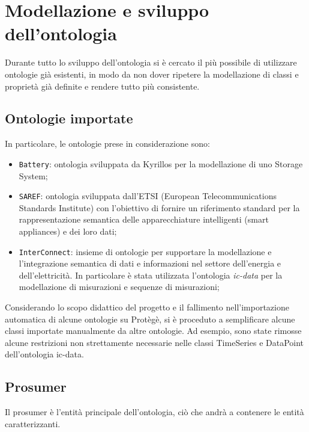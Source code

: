 \chapter{Modellazione e sviluppo dell'ontologia}
Durante tutto lo sviluppo dell'ontologia si è cercato il più possibile di utilizzare ontologie già esistenti, in modo da non dover ripetere la modellazione di classi e proprietà già definite e rendere tutto più consistente.

\section{Ontologie importate}

In particolare, le ontologie prese in considerazione sono:
\begin{itemize}
    \item \texttt{Battery}\cite{battery_kyrillos}: ontologia sviluppata da Kyrillos per la modellazione di uno Storage System;
    \item \texttt{SAREF}\cite{saref}: ontologia sviluppata dall'ETSI (European Telecommunications Standards Institute) con l'obiettivo di fornire un riferimento standard per la rappresentazione semantica delle apparecchiature intelligenti (smart appliances) e dei loro dati;
    \item \texttt{InterConnect}\cite{interconnect}: insieme di ontologie per supportare la modellazione e l'integrazione semantica di dati e informazioni nel settore dell'energia e dell'elettricità. In particolare è stata utilizzata l'ontologia \textit{ic-data}\cite{ic-data} per la modellazione di misurazioni e sequenze di misurazioni;
\end{itemize}

Considerando lo scopo didattico del progetto e il fallimento nell'importazione automatica di alcune ontologie su Protègè, si è proceduto a semplificare alcune classi importate manualmente da altre ontologie. Ad esempio, sono state rimosse alcune restrizioni non strettamente necessarie nelle classi TimeSeries e DataPoint dell'ontologia ic-data.

\section{Prosumer}
Il prosumer è l'entità principale dell'ontologia, ciò che andrà a contenere le entità caratterizzanti.


